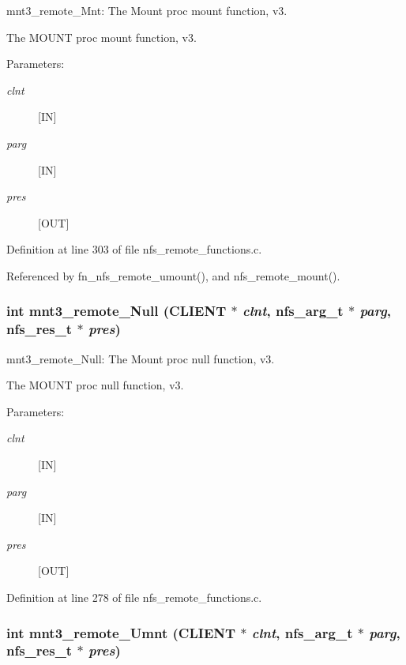 mnt3\_\-remote\_\-Mnt: The Mount proc mount function, v3.

The MOUNT proc mount function, v3.

\begin{Desc}
\item[Parameters:]
\begin{description}
\item[{\em clnt}][IN] \item[{\em parg}][IN] \item[{\em pres}][OUT] \end{description}
\end{Desc}


Definition at line 303 of file nfs\_\-remote\_\-functions.c.

Referenced by fn\_\-nfs\_\-remote\_\-umount(), and nfs\_\-remote\_\-mount().
\subsubsection{\setlength{\rightskip}{0pt plus 5cm}int mnt3\_\-remote\_\-Null (CLIENT $\ast$ {\em clnt}, nfs\_\-arg\_\-t $\ast$ {\em parg}, nfs\_\-res\_\-t $\ast$ {\em pres})}\label{group__MNTprocs_ga6}


mnt3\_\-remote\_\-Null: The Mount proc null function, v3.

The MOUNT proc null function, v3.

\begin{Desc}
\item[Parameters:]
\begin{description}
\item[{\em clnt}][IN] \item[{\em parg}][IN] \item[{\em pres}][OUT] \end{description}
\end{Desc}


Definition at line 278 of file nfs\_\-remote\_\-functions.c.
\subsubsection{\setlength{\rightskip}{0pt plus 5cm}int mnt3\_\-remote\_\-Umnt (CLIENT $\ast$ {\em clnt}, nfs\_\-arg\_\-t $\ast$ {\em parg}, nfs\_\-res\_\-t $\ast$ {\em pres})}\label{group__MNTprocs_ga9}


